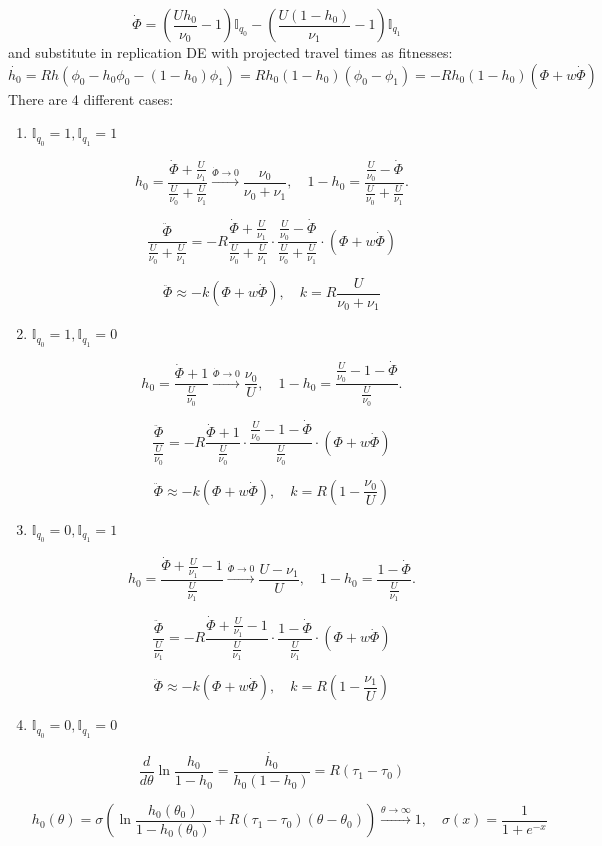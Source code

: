 \documentclass[12pt]{article}
\begin{document}
 $$ \quad \dot{\Phi} = \left(\frac{U h_0}{\nu_0} - 1 \right) \mathbb{I}_{q_0} - \left(\frac{U (1 - h_0)}{\nu_1} - 1 \right)\mathbb{I}_{q_1} $$
and substitute in replication DE with projected travel times as fitnesses:
 $$ \dot{h_0} = Rh(\phi_0 - h_0\phi_0 -(1-h_0)\phi_1) = Rh_0(1-h_0)(\phi_0 - \phi_1) = -Rh_0(1-h_0)(\Phi + w \dot{\Phi} ) $$
There are 4 different cases:
 \begin{enumerate}
 
	\item $  \mathbb{I}_{q_0} = 1,  \mathbb{I}_{q_1} = 1 $
		
	$$ h_0 = \frac{\dot{\Phi} + \frac{U}{\nu_1}}{\frac{U}{\nu_0} + \frac{U}{\nu_1}} \stackrel{\dot \Phi \to 0}{\to} \frac{\nu_0}{\nu_0 + \nu_1 },\quad 1 - h_0 = \frac{\frac{U}{\nu_0} - \dot{\Phi}}{{\frac{U}{\nu_0} + \frac{U}{\nu_1}}} . $$

$$ \frac{\ddot{\Phi}}{\frac{U}{\nu_0} + \frac{U}{\nu_1}} = -R \frac{\dot{\Phi} + \frac{U}{\nu_1}}{\frac{U}{\nu_0} + \frac{U}{\nu_1}} \cdot \frac{\frac{U}{\nu_0} - \dot{\Phi}}{\frac{U}{\nu_0} + \frac{U}{\nu_1}} \cdot (\Phi + w \dot{\Phi}) $$

$$ \ddot{\Phi} \approx - k (\Phi + w \dot{\Phi}), \quad k = R \frac{U}{\nu_0 + \nu_1} $$

 
	
	\item  $  \mathbb{I}_{q_0} = 1,  \mathbb{I}_{q_1} = 0 $
	
		$$ h_0 = \frac{\dot{\Phi} + 1}{\frac{U}{\nu_0}} \stackrel{\dot \Phi \to 0}{\to} \frac{\nu_0}{U},\quad 1 - h_0 = \frac{\frac{U}{\nu_0} - 1 - \dot{\Phi}}{{\frac{U}{\nu_0} }} . $$

$$ \frac{\ddot{\Phi}}{\frac{U}{\nu_0} } = -R \frac{\dot{\Phi} + 1}{\frac{U}{\nu_0} } \cdot \frac{\frac{U}{\nu_0} - 1 - \dot{\Phi}}{{\frac{U}{\nu_0} }} \cdot (\Phi + w \dot{\Phi}) $$

$$ \ddot{\Phi} \approx - k (\Phi + w \dot{\Phi}), \quad k = R( 1 -\frac{\nu_0}{U}) $$

	\item  $  \mathbb{I}_{q_0} = 0,  \mathbb{I}_{q_1} = 1 $
	
		$$ h_0 = \frac{\dot{\Phi} + \frac{U}{\nu_1} - 1}{\frac{U}{\nu_1}} \stackrel{\dot \Phi \to 0}{\to} \frac{U - \nu_1}{U} ,\quad 1 - h_0 = \frac{ 1 - \dot{\Phi}}{{\frac{U}{\nu_1} }} . $$

$$ \frac{\ddot{\Phi}}{\frac{U}{\nu_1} } = -R \frac{\dot{\Phi} + \frac{U}{\nu_1} - 1}{\frac{U}{\nu_1}} \cdot \frac{ 1 - \dot{\Phi}}{{\frac{U}{\nu_1} }} \cdot (\Phi + w \dot{\Phi}) $$

$$ \ddot{\Phi} \approx - k (\Phi + w \dot{\Phi}), \quad k = R( 1 -\frac{\nu_1}{U}) $$

	\item  $  \mathbb{I}_{q_0} = 0,  \mathbb{I}_{q_1} = 0 $ 
	
	$$ \frac{d}{d\theta} \ln \frac{h_0}{1-h_0} = \frac{\dot{h_0}}{h_0 (1-h_0)} = R(\tau_1 - \tau_0)$$
	
	$$ h_0(\theta) = \sigma \left( \ln \frac{h_0(\theta_0)}{1 - h_0(\theta_0)} + R(\tau_1 - \tau_0)(\theta - \theta_0) \right) \stackrel{\theta \to  \infty}{\to} 1, \quad \sigma(x) = \frac{1}{1 + e^{-x}}$$
 
 \end{enumerate}
\end{document}
